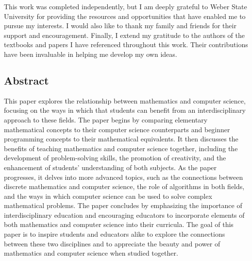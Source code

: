 This work was completed independently, but I am deeply grateful to Weber State University for providing the resources and opportunities that have enabled me to pursue my interests. I would also like to thank my family and friends for their support and encouragement. Finally, I extend my gratitude to the authors of the textbooks and papers I have referenced throughout this work. Their contributions have been invaluable in helping me develop my own ideas.

\subsection{Abstract}

This paper explores the relationship between mathematics and computer science, focusing on the ways in which that students can benefit from an interdisciplinary approach to these fields. The paper begins by comparing elementary mathematical concepts to their computer science counterparts and beginner programming concepts to their mathematical equivalents. It then discusses the benefits of teaching mathematics and computer science together, including the development of problem-solving skills, the promotion of creativity, and the enhancement of students' understanding of both subjects. As the paper progresses, it delves into more advanced topics, such as the connections between discrete mathematics and computer science, the role of algorithms in both fields, and the ways in which computer science can be used to solve complex mathematical problems. The paper concludes by emphasizing the importance of interdisciplinary education and encouraging educators to incorporate elements of both mathematics and computer science into their curricula. The goal of this paper is to inspire students and educators alike to explore the connections between these two disciplines and to appreciate the beauty and power of mathematics and computer science when studied together.


